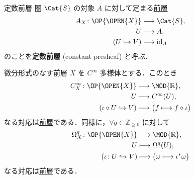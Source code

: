 \documentclass[TQFT_main]{subfiles}
\begin{document}
\begin{myexample}[label=ex:constant-presheaf]{定数前層}
    圏 $\Cat{S}$ の対象 $A$ に対して定まる\hyperref[def:presheaf]{前層}
    \begin{align}
        A_X \colon \OP{\OPEN{X}} &\lto \Cat{S}, \\
        U &\lmto A, \\
        (U \hookrightarrow V) &\lmto \mathrm{id}_{A}
    \end{align}
    のことを\textbf{定数前層} (constant presheaf) と呼ぶ．
\end{myexample}

\begin{myexample}[label=ex:presheaf-diff]{微分形式のなす前層}
    $X$ を $C^\infty$ 多様体とする．このとき
    \begin{align}
        C^\infty_X \colon \OP{\OPEN{X}} &\lto \MOD{\mathbb{R}}, \\
        U &\lmto C^\infty (U), \\
        (\iota \circ U \hookrightarrow V) &\lmto \bigl( f \lmto f \circ \iota \bigr) 
    \end{align}
    なる対応は\hyperref[def:presheaf]{前層}である．同様に，$\forall q \in \mathbb{Z}_{\ge 0}$ に対して
    \begin{align}
        \Omega^q_X \colon \OP{\OPEN{X}} &\lto \MOD{\mathbb{R}}, \\
        U &\lmto \Omega^q (U), \\
        (\iota \colon U \hookrightarrow V) &\lmto \bigl( \omega \lmto \iota^* \omega \bigr) 
    \end{align}
    なる対応は\hyperref[def:presheaf]{前層}である．
\end{myexample}

    
\end{document}
